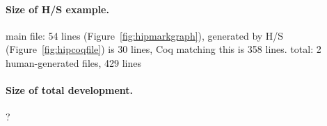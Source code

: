 {\paragraph{Size of H/S example.}
main file: 54 lines (Figure~\ref{fig:hipmarkgraph}),  generated by H/S (Figure~\ref{fig:hipcoqfile}) is 30 lines, Coq  matching this  is 358 lines.
total: 2 human-generated files, 429 lines

\paragraph{Size of total development.} ?
}
